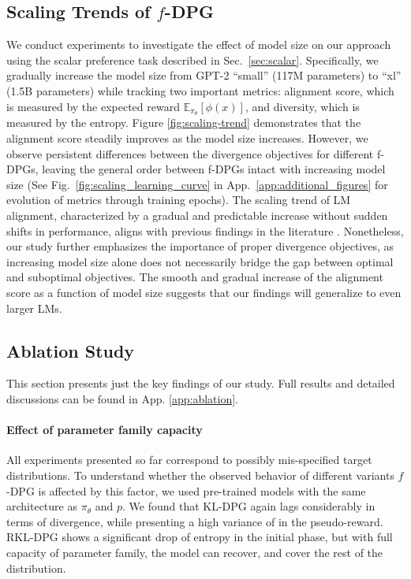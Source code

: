 \subsection{Scaling Trends of $f$-DPG}\label{sec:scaling_trend}
We conduct experiments to investigate the effect of model size on our approach using the  scalar preference task described in Sec.~\ref{sec:scalar}. Specifically, we gradually increase the model size from GPT-2 ``small'' (117M parameters) to ``xl'' (1.5B parameters) while tracking two important metrics: alignment score, which is measured by the expected reward $\mathbb{E}_{\pi_\theta}[\phi(x)]$, and diversity, which is measured by the entropy. Figure \ref{fig:scaling-trend} demonstrates that the alignment score steadily improves as the model size increases. However, we observe persistent differences between the divergence objectives for different f-DPGs, leaving the general order between f-DPGs intact with increasing model size (See Fig.~\ref{fig:scaling_learning_curve} in App.~\ref{app:additional_figures} for evolution of metrics through training epochs). The scaling trend of LM alignment, characterized by a gradual and predictable increase without sudden shifts in performance, aligns with previous findings in the literature \cite{bai2022training}. Nonetheless, our study further emphasizes the importance of proper divergence objectives, as increasing model size alone does not necessarily bridge the gap between optimal and suboptimal objectives. The smooth and gradual increase of the alignment score as a function of model size suggests that our findings will generalize to even larger LMs.

\subsection{Ablation Study}

This section presents just the key findings of our study. {Full results} and detailed discussions can be found in {App. \ref{app:ablation}}.

\paragraph{Effect of parameter family {capacity}} {All experiments presented so far correspond to {possibly} mis-specified target distribution{s}. To understand whether the observed behavior of different variants $f$-DPG is affected by this factor, we used pre-trained models with the same architecture {as ${\pi_\theta}$ and $p$}.} We found that KL-DPG again lags considerably {in terms of divergence, while presenting a} high variance of {in the} pseudo-reward. RKL-DPG shows a significant drop of entropy in the initial phase, but with full capacity of parameter family, the model can recover, and cover the rest of the distribution.

